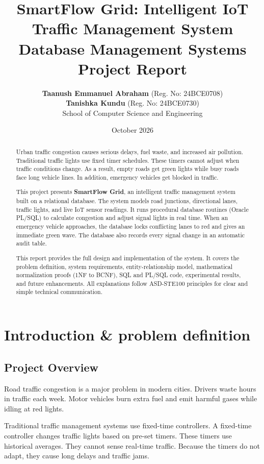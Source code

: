 \documentclass[11pt,a4paper]{article}
\title{\textbf{SmartFlow Grid: Intelligent IoT Traffic Management System}\\[0.2cm]
\large Database Management Systems Project Report}
\author{\textbf{Taanush Emmanuel Abraham} (Reg. No: 24BCE0708) \\
\textbf{Tanishka Kundu} (Reg. No: 24BCE0730) \\[0.2cm]
School of Computer Science and Engineering}
\date{October 2026}
\begin{document}
\maketitle

\begin{abstract}
Urban traffic congestion causes serious delays, fuel waste, and increased air pollution. Traditional traffic lights use fixed timer schedules. These timers cannot adjust when traffic conditions change. As a result, empty roads get green lights while busy roads face long vehicle lines. In addition, emergency vehicles get blocked in traffic. 

This project presents \textbf{SmartFlow Grid}, an intelligent traffic management system built on a relational database. The system models road junctions, directional lanes, traffic lights, and live IoT sensor readings. It runs procedural database routines (Oracle PL/SQL) to calculate congestion and adjust signal lights in real time. When an emergency vehicle approaches, the database locks conflicting lanes to red and gives an immediate green wave. The database also records every signal change in an automatic audit table. 

This report provides the full design and implementation of the system. It covers the problem definition, system requirements, entity-relationship model, mathematical normalization proofs (1NF to BCNF), SQL and PL/SQL code, experimental results, and future enhancements. All explanations follow ASD-STE100 principles for clear and simple technical communication.
\end{abstract}

\tableofcontents
\newpage

\section{Introduction \& problem definition}

\subsection{Project Overview}
Road traffic congestion is a major problem in modern cities. Drivers waste hours in traffic each week. Motor vehicles burn extra fuel and emit harmful gases while idling at red lights. 

Traditional traffic management systems use fixed-time controllers. A fixed-time controller changes traffic lights based on pre-set timers. These timers use historical averages. They cannot sense real-time traffic. Because the timers do not adapt, they cause long delays and traffic jams.
\end{document}
